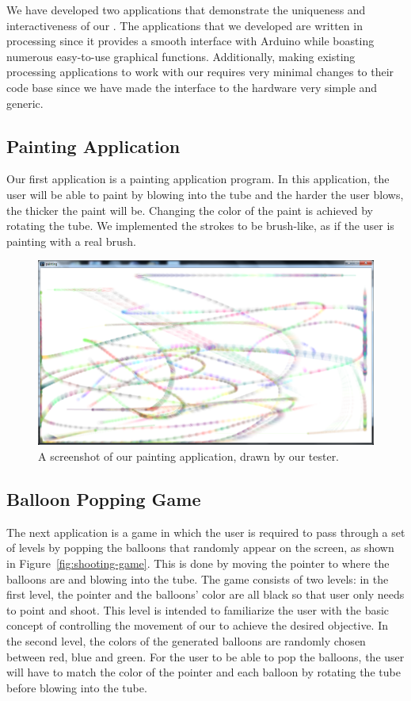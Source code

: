 We have developed two applications that demonstrate the uniqueness and interactiveness of our \tube. The applications that we developed are written in processing since it provides a smooth interface with Arduino while boasting numerous easy-to-use graphical functions. Additionally, making existing processing applications to work with our \tube requires very minimal changes to their code base since we have made the interface to the hardware very simple and generic.

\subsection{\textbf{Painting Application}}

Our first application is a painting application program. In this application, the user will be able to paint by blowing into the tube and the harder the user blows, the thicker the paint will be. Changing the color of the paint is achieved by rotating the tube. We implemented the strokes to be brush-like, as if the user is painting with a real brush.

\begin{figure}
  \centering
  \includegraphics[width=\linewidth]{./figs/tube3.png}
  \caption{A screenshot of our painting application, drawn by our tester.}
  \label{fig:painting}
\end{figure}

\subsection{\textbf{Balloon Popping Game}}

The next application is a game in which the user is required to pass through a set of levels by popping the balloons that randomly appear on the screen, as shown in Figure~\ref{fig:shooting-game}. This is done by moving the pointer to where the balloons are and blowing into the tube. The game consists of two levels: in the first level, the pointer and the balloons' color are all black so that user only needs to point and shoot. This level is intended to familiarize the user with the basic concept of controlling the movement of our \tube to achieve the desired objective. In the second level, the colors of the generated balloons are randomly chosen between red, blue and green. For the user to be able to pop the balloons, the user will have to match the color of the pointer and each balloon by rotating the tube before blowing into the tube.

